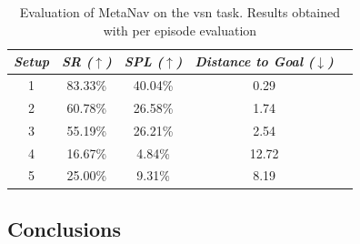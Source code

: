 \begin{table}
    \centering
    \begin{tabular}{c|cccc}
        \toprule
        \textit{\textbf{Setup}} & \textit{\textbf{SR ($\uparrow$)}} & \textbf{\textit{SPL ($\uparrow$)}} & \textit{\textbf{Distance to Goal ($\downarrow$)}} \\ \midrule
        1                       & 83.33\%                           & 40.04\%                            & 0.29                                              \\
        2                       & 60.78\%                           & 26.58\%                            & 1.74                                              \\
        3                       & 55.19\%                           & 26.21\%                            & 2.54                                              \\
        4                       & 16.67\%                           & 4.84\%                             & 12.72                                             \\
        5                       & 25.00\%                           & 9.31\%                             & 8.19                                              \\
    \end{tabular}
    \caption{Evaluation of MetaNav on the \acrshort{vsn} task. Results obtained with per episode evaluation}
    \label{tab:metanav_episode}
\end{table}

\subsection{Conclusions}\label{subsec:conclusions_metanav}